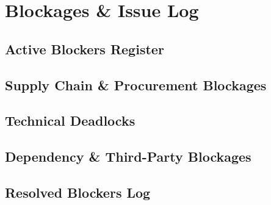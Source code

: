 \section{Blockages \& Issue Log}

\subsection{Active Blockers Register}

\subsection{Supply Chain \& Procurement Blockages}

\subsection{Technical Deadlocks}

\subsection{Dependency \& Third-Party Blockages}

\subsection{Resolved Blockers Log}
